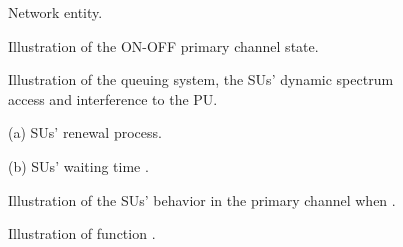 \documentclass[11pt,draftcls]{IEEEtran}{\onecolumn}
\begin{document}
{\renewcommand\baselinestretch{1.13}\selectfont



\par}


















\newpage
\begin{figure}[!h]
  \centerline{}
  \caption{Network entity.}\label{fig1}
\end{figure}

\begin{figure}[!h]
  \centerline{}
  \caption{Illustration of the ON-OFF primary channel state.}\label{fig2}
\end{figure}

\begin{figure}[!h]
\centering
  \caption{Illustration of the queuing system, the SUs' dynamic spectrum access and interference to the PU.}\label{fig3}
\end{figure}

\begin{figure}[!h]
\begin{minipage}[t]{.55\linewidth}
  \centering
  \centerline{}
  \vspace{-0.3cm}
  \centerline{\scriptsize{(a) SUs' renewal process.}}
\end{minipage}
\hfill
\begin{minipage}[t]{0.45\linewidth}
  \centering
  \centerline{}
  \vspace{-0.3cm}
  \centerline{\scriptsize{(b) SUs' waiting time .}}
  \medskip
\end{minipage}
\caption{Illustration of the SUs' behavior in the primary channel
when .}\label{fig4}
\end{figure}

\begin{figure}[!h]
  \centerline{}\vspace{-0.5cm}
  \caption{Illustration of function .}\label{fig6}
\end{figure}
\end{document}

